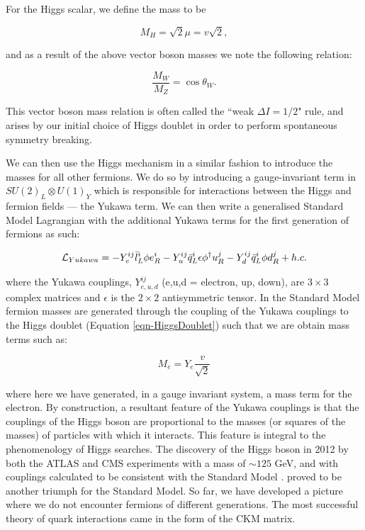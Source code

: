 For the Higgs scalar, we define the mass to be 

\begin{equation}
M_H = \sqrt{2}\mu = v\sqrt{2},
\end{equation}

and as a result of the above vector boson masses we note the following relation:

\begin{equation}
\frac{M_W}{M_Z} = \cos\theta_W.
\end{equation}

This vector boson mass relation is often called the ``weak $\Delta I = 1/2$" rule, and arises by our initial choice of Higgs doublet in order to perform spontaneous symmetry breaking.

We can then use the Higgs mechanism in a similar fashion to introduce the masses for all other fermions. We do so by introducing a gauge-invariant term in $SU(2)_L \otimes U(1)_Y$ which is responsible for interactions between the Higgs and fermion fields --- the Yukawa term. We can then write a generalised Standard Model Lagrangian with the additional Yukawa terms for the first generation of fermions as such: 

\begin{equation}
\mathcal{L}_{Yukawa} = -Y^{ij}_e \bar{l}^i_L \phi e^i_R - Y^{ij}_u \bar{q}^i_L \epsilon \phi^{\dagger} u^j_R - Y^{ij}_d \bar{q}^i_L \phi d^j_R + h.c.
\end{equation}

where the Yukawa couplings, $Y^{ij}_{e,u,d}$ (e,u,d = electron, up, down), are $3\times3$ complex matrices and $\epsilon$ is the $2\times2$ antisymmetric tensor. In the Standard Model fermion masses are generated through the coupling of the Yukawa couplings to the Higgs doublet (Equation \ref{eqn-HiggsDoublet}) such that we are obtain mass terms such as:

\begin{equation}
M_e = Y_e\frac{v}{\sqrt{2}}
\end{equation}

where here we have generated, in a gauge invariant system, a mass term for the electron. By construction, a resultant feature of the Yukawa couplings is that the couplings of the Higgs boson are proportional to the masses (or squares of the masses) of particles with which it interacts. This feature is integral to the phenomenology of Higgs searches. The discovery of the Higgs boson in 2012 by both the ATLAS \cite{Aad:2012tfa} and CMS \cite{b846af59f42d440a9058d93ed5df44cf} experiments with a mass of $\sim125$ GeV, and with couplings calculated to be consistent with the Standard Model \cite{Chatrchyan:2013lba, Aad:2013wqa}. proved to be another triumph for the Standard Model. So far, we have developed a picture where we do not encounter fermions of different generations. The most successful theory of quark interactions came in the form of the CKM matrix.

